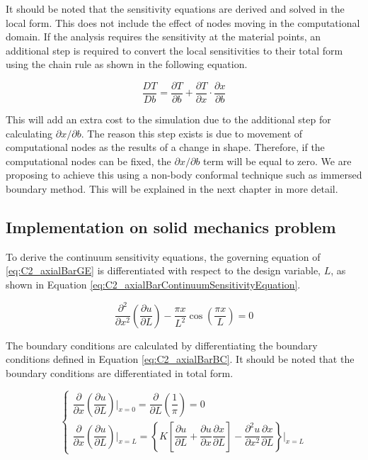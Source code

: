 It should be noted that the sensitivity equations are derived and solved in the local form. This does not include the effect of nodes moving in the computational domain. If the analysis requires the sensitivity at the material points, an additional step is required to convert the local sensitivities to their total form using the chain rule as shown in the following equation.

\begin{equation*}
    \frac{DT}{Db} = \frac{\partial T}{\partial b} + \frac{\partial T}{\partial x} \cdot \frac{\partial x}{\partial b}
\end{equation*}

This will add an extra cost to the simulation due to the additional step for calculating $\partial x/\partial b$. The reason this step exists is due to movement of computational nodes as the results of a change in shape. Therefore, if the computational nodes can be fixed, the $\partial x/\partial b$ term will be equal to zero. We are proposing to achieve this using a non-body conformal technique such as immersed boundary method. This will be explained in the next chapter in more detail.

\subsection{Implementation on solid mechanics problem}
To derive the continuum sensitivity equations, the governing equation of \eqref{eq:C2_axialBarGE} is differentiated with respect to the design variable, $L$, as shown in Equation \eqref{eq:C2_axialBarContinuumSensitivityEquation}.

\begin{equation}\label{eq:C2_axialBarContinuumSensitivityEquation}
    \frac{\partial^2}{\partial x^2} \left( \frac{\partial u}{\partial L} \right) - 
    \frac{\pi x}{L^2} \cos \left( \frac{\pi x}{L} \right) = 0
\end{equation}

The boundary conditions are calculated by differentiating the boundary conditions defined in Equation \eqref{eq:C2_axialBarBC}. It should be noted that the boundary conditions are differentiated in total form.

\begin{equation}\label{eq:C2_axialBarContinuumSensitivityBoundaryConditions}
    \begin{cases}
    \dfrac{\partial}{\partial x} \left( \dfrac{\partial u}{\partial L} \right) \bigg|_{x = 0} = 
    \dfrac{\partial }{\partial L} \left( \dfrac{1}{\pi} \right) = 0
    \\
    \dfrac{\partial}{\partial x} \left( \dfrac{\partial u}{\partial L} \right) \bigg|_{x = L} = 
    \left\{
    K \left[ \dfrac{\partial u}{\partial L} + \dfrac{\partial u}{\partial x} \dfrac{\partial x}{\partial L} \right] - 
    \dfrac{\partial^2 u}{\partial x^2} \dfrac{\partial x}{\partial L}
    \right\} \bigg|_{x = L}
    \end{cases}
\end{equation}


